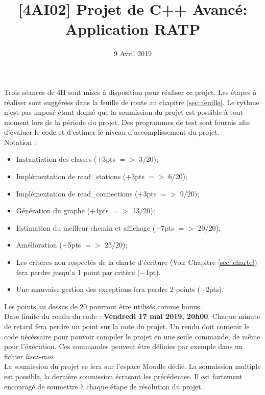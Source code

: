 \documentclass[9pts]{article}
\title{[4AI02] Projet de C++ Avancé: Application RATP}
\date{9 Avril 2019}
\begin{document}
\makeatletter

\let\ps@plain=\ps@fancy

\makeatother
\maketitle

Trois séances de 4H sont mises à disposition pour réaliser ce projet.
Les étapes à réaliser sont suggérées dans la feuille de route au chapitre \ref{sec::feuille}. Le rythme n'est pas imposé étant donné que la soumission du projet est possible à tout moment lors de la période du projet.
Des programmes de test sont fournis afin d'évaluer le code et d'estimer le niveau d'accomplissement du projet.\\

Notation :
\begin{itemize}
\item Instantiation des classes ($+$3pts $=>$ 3$/$20);
\item Implémentation de read\_stations ($+$3pts $=>$ 6$/$20);
\item Implémentation de read\_connections ($+$3pts $=>$ 9$/$20);
\item Génération du graphe ($+$4pts $=>$ 13$/$20);
\item Estimation du meilleur chemin et affichage ($+$7pts $=>$ 20$/$20);
\item Amélioration ($+$5pts $=>$ 25$/$20);
\item Les critères non respectés de la charte d'écriture (Voir Chapitre \ref{sec::charte}) fera perdre jusqu'a 1 point par critère ($-1$pt).
\item Une mauvaise gestion des exceptions fera perdre 2 points ($-2$pts).\\
\end{itemize}

Les points au dessus de 20 pourront être utilisés comme bonus.\\

Date limite du rendu du code : \textbf{Vendredi 17 mai 2019, 20h00}. Chaque minute de retard fera perdre un point sur la note du projet. Un rendu doit contenir le code nécéssaire pour pouvoir compiler le projet en une seule commande, de même pour l'éxécution. Ces commandes peuvent être définies par exemple dans un fichier \emph{lisez-moi}. \\

La soumission du projet se fera sur l'espace Moodle dédié. La soumission multiple est possible, la dernière soumission écrasant les précédentes. Il est fortement encouragé de soumettre à chaque étape de résolution du projet.
\end{document}
